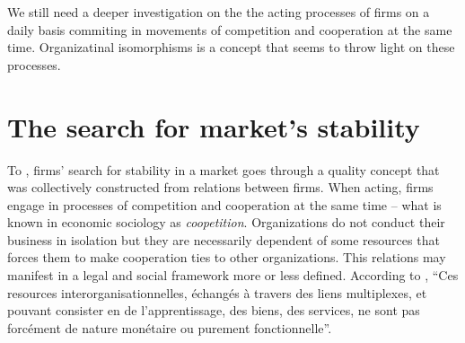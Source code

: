 \documentclass[a4paper, 12pt, openright, oneside, german, french, brazil, english, article]{abntex2}
\begin{document}

	We still need a deeper investigation on the the acting processes of firms on a daily basis commiting in movements of competition and cooperation at the same time. Organizatinal isomorphisms is a concept that seems to throw light on these processes.


	\section{The search for market's stability}
	
	
	To , firms' search for stability in a market goes through a quality concept that was collectively constructed from relations between firms. When acting, firms engage in processes of competition and cooperation at the same time -- what is known in economic sociology as \textit{coopetition}. Organizations do not conduct their business in isolation but they are necessarily dependent of some resources that forces them to make cooperation ties to other organizations. This relations may manifest in a legal and social framework more or less defined. According to , ``Ces resources interorganisationnelles, échangés à travers des liens multiplexes, et pouvant consister en de l'apprentissage, des biens, des services, ne sont pas forcément de nature monétaire ou purement fonctionnelle''.
	
\end{document}
